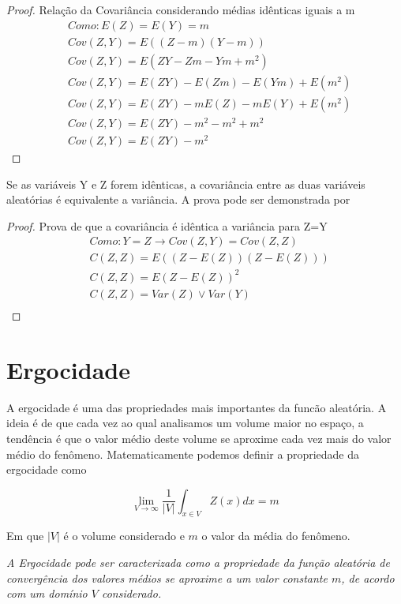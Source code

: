  \begin{proof}
 	Relação da Covariância considerando médias idênticas iguais a m
 	\begin{align*}
 	&Como:  E(Z) = E(Y) = m  \\
 	&Cov\left(Z,Y\right)= E\left( (Z-m) (Y-m) \right)\\
 	&Cov\left(Z,Y\right)= E\left( ZY - Zm - Ym +m^2 \right)\\
 	&Cov\left(Z,Y\right)= E(ZY) - E(Zm) - E(Ym) +E(m^2)\\
 	&Cov\left(Z,Y\right)= E(ZY) - mE(Z) - mE(Y) +E(m^2)\\
 	&Cov\left(Z,Y\right)= E(ZY) - m^2 - m^2 +m^2\\
 	&Cov\left(Z,Y\right)= E(ZY) - m^2
 	\end{align*}
 \end{proof}

Se as variáveis Y e Z forem idênticas, a covariância entre as duas variáveis aleatórias é equivalente a variância. A prova pode ser demonstrada por

\begin{proof}
	Prova de que a covariância é idêntica a variância para Z=Y
	\begin{align*}
	&Como: Y=Z \rightarrow Cov(Z,Y) = Cov(Z,Z)  \\
	&C\left(Z,Z\right) = E\left( (Z-E(Z))(Z-E(Z)) \right) \\
	&C\left(Z,Z\right) = E\left( Z-E(Z) \right)^2 \\
	&C\left(Z,Z\right) = Var(Z) \vee   Var(Y) \\
	\end{align*}
\end{proof}

\section{Ergocidade} 

A ergocidade é uma das propriedades mais importantes da funcão aleatória. A ideia é de que cada vez ao qual analisamos um volume maior no espaço, a tendência é que o valor médio deste volume se aproxime cada vez mais do valor médio do fenômeno. Matematicamente podemos definir a propriedade da ergocidade como 

\begin{equation}
\lim_{V\rightarrow \infty}\frac{1}{|V|}\int_{x \in V}Z(x)dx = m 
\end{equation}

Em que $|V|$ é o volume considerado e $m$ o valor da média do fenômeno. 
\begin{definition}[Ergocidade]
	\textit{A Ergocidade pode ser caracterizada como a propriedade da função aleatória de convergência dos valores médios se aproxime a um valor constante $m$, de acordo com um domínio $V$ considerado.}
\end{definition}

